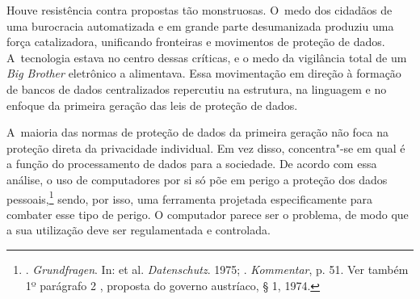Houve resistência contra propostas tão monstruosas. O~medo dos cidadãos
de uma burocracia automatizada e em grande parte desumanizada produziu
uma força catalizadora, unificando fronteiras e movimentos de proteção
de dados. A~tecnologia estava no centro dessas críticas, e o medo da
vigilância total de um \emph{Big Brother} eletrônico a alimentava. Essa
movimentação em direção à formação de bancos de dados centralizados
repercutiu na estrutura, na linguagem e no enfoque da primeira geração
das leis de proteção de dados.

A~maioria das normas de proteção de dados da primeira geração não foca
na proteção direta da privacidade individual. Em vez disso, concentra"-se
em qual é a função do processamento de dados para a sociedade. De acordo
com essa análise, o uso de computadores por si só põe em perigo a
proteção dos dados pessoais,\footnote{. \emph{Grundfragen}.
  In:  et al. \emph{Datenschutz}. 1975; .
  \emph{Kommentar}, p. 51. Ver também 1º parágrafo 2 , proposta do
  governo austríaco, § 1, 1974.} sendo, por isso, uma ferramenta
projetada especificamente para combater esse tipo de perigo. O
computador parece ser o problema, de modo que a sua utilização deve ser
regulamentada e controlada.


